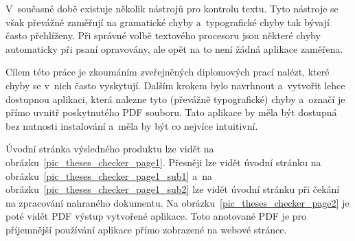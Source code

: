 V~současné době existuje několik nástrojů pro kontrolu textu. Tyto nástroje se
však převážně zaměřují na gramatické chyby a~typografické chyby tak bývají často
přehlíženy. Při správné volbě textového procesoru jsou některé chyby automaticky
při psaní opravovány, ale opět na to není žádná aplikace zaměřena.

Cílem této práce je zkoumáním zveřejněných diplomových prací nalézt, které chyby
se v~nich často vyskytují. Dalším krokem bylo navrhnout a~vytvořit lehce
dostupnou aplikaci, která nalezne tyto (převážně typografické) chyby a~označí
je přímo uvnitř poskytnutého PDF souboru. Tato aplikace by měla být dostupná bez
nutnosti instalování a~měla by být co nejvíce intuitivní.

Úvodní stránka výsledného produktu lze vidět na
obrázku~\ref{pic_theses_checker_page1}. Přesněji lze vidět úvodní stránku
na obrázku~\ref{pic_theses_checker_page1_sub1} a~na
obrázku~\ref{pic_theses_checker_page1_sub2} lze vidět úvodní stránku
při čekání na zpracování nahraného dokumentu. 
 Na obrázku~\ref{pic_theses_checker_page2}
je poté vidět PDF výstup vytvořené aplikace. Toto anotované PDF je pro
příjemnější používání aplikace přímo zobrazené na webové stránce.

